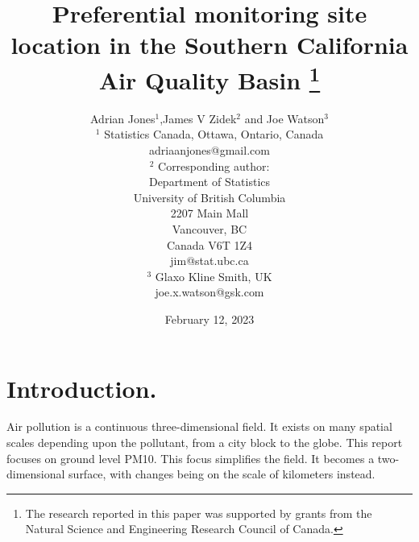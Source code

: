 \documentclass{article}
\begin{document}
\title{Preferential monitoring site location in the Southern California Air Quality Basin
\thanks{
The research reported in this paper was supported by  grants from the Natural Science and Engineering Research Council of Canada.} 
}

\date{February 12, 2023}

\author{Adrian Jones$^1$,James V Zidek$^2$ and Joe Watson$^3$\\
\small
 $^1$ Statistics Canada, Ottawa, Ontario, Canada \\\small
 adriaanjones@gmail.com\\\small
 $^2$ Corresponding author:\\\small
Department of Statistics\\\small
University of British Columbia \\\small
2207 Main Mall\\\small
Vancouver, BC \\\small
Canada V6T 1Z4\\\small
 jim@stat.ubc.ca \\\small
 $^3$ Glaxo Kline Smith, UK\\\small
 joe.x.watson@gsk.com
 }

\maketitle






\maketitle



\cleardoublepage



\section{Introduction.}\label{sec:introduction}

Air pollution is a continuous three-dimensional field.  It exists on many spatial scales depending upon the pollutant, from a city block to the globe.  This report focuses on ground level \ac{PM10}.  This focus simplifies the field. It becomes a two-dimensional surface, with changes being on the scale of kilometers \citep{CFR:Title40-58} instead.   
\end{document}
